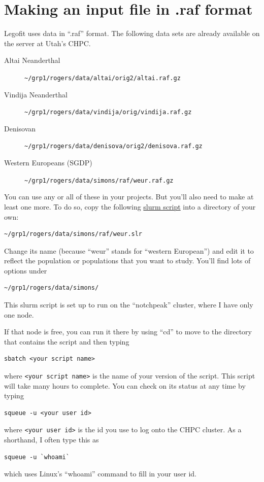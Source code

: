 \documentclass[11pt]{article}
\begin{document}
\section{Making an input file in .raf format}
\label{sec.raf}
Legofit uses data in ``.raf'' format. The following data sets are
already available on the server at Utah's CHPC.
\begin{description}
\item[Altai Neanderthal]
\verb|~/grp1/rogers/data/altai/orig2/altai.raf.gz|

\item[Vindija Neanderthal]
\verb|~/grp1/rogers/data/vindija/orig/vindija.raf.gz|

\item[Denisovan]
\verb|~/grp1/rogers/data/denisova/orig2/denisova.raf.gz|

\item[Western Europeans (SGDP)]
\verb|~/grp1/rogers/data/simons/raf/weur.raf.gz|
\end{description}
You can use any or all of these in your projects. But you'll also need
to make at least one more. To do so, copy the following
\href{https://alanrogers.github.io/agar22/legofit/weur.slr.html}{slurm
  script} into a directory of your own:
\begin{verbatim}
~/grp1/rogers/data/simons/raf/weur.slr
\end{verbatim}
Change its name (because ``weur'' stands for ``western European'') and
edit it to reflect the population or populations that you want to
study. You'll find lots of options under
\begin{verbatim}
~/grp1/rogers/data/simons/
\end{verbatim}
This slurm script is set up to run on the ``notchpeak'' cluster, where I have
only one node.

If that node is free, you can run it there by using ``cd'' to move to
the directory that contains the script and then typing
\begin{verbatim}
sbatch <your script name>
\end{verbatim}
where \verb|<your script name>| is the name of your version of the
script. This script will take many hours to complete. You can check on
its status at any time by typing
\begin{verbatim}
squeue -u <your user id>
\end{verbatim}
where \verb|<your user id>| is the id you use to log onto the CHPC cluster.
As a shorthand, I often type this as
\begin{verbatim}
squeue -u `whoami`
\end{verbatim}
which uses Linux's ``whoami'' command to fill in your user id.
\end{document}
